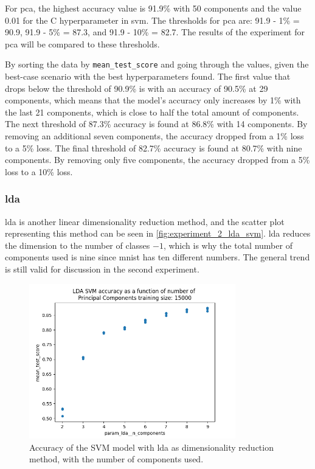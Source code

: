 For \gls{pca}, the highest accuracy value is 91.9\% with 50 components and the value 0.01 for the C hyperparameter in \gls{svm}. The thresholds for \gls{pca} are: 91.9 - 1\% = 90.9, 91.9 - 5\% = 87.3, and 91.9 - 10\% = 82.7. The results of the experiment for \gls{pca} will be compared to these thresholds.

By sorting the data by \texttt{mean\_test\_score} and going through the values, given the best-case scenario with the best hyperparameters found. The first value that drops below the threshold of 90.9\% is with an accuracy of 90.5\% at 29 components, which means that the model's accuracy only increases by 1\% with the last 21 components, which is close to half the total amount of components.
The next threshold of 87.3\% accuracy is found at 86.8\% with 14 components. By removing an additional seven components, the accuracy dropped from a 1\% loss to a 5\% loss.
The final threshold of 82.7\% accuracy is found at 80.7\% with nine components. By removing only five components, the accuracy dropped from a 5\% loss to a 10\% loss.

\subsubsection{\gls{lda}}\label{subsubsec:experiment_2_lda}
\gls{lda} is another linear dimensionality reduction method, and the scatter plot representing this method can be seen in \autoref{fig:experiment_2_lda_svm}. \gls{lda} reduces the dimension to the number of classes $-1$, which is why the total number of components used is nine since \gls{mnist} has ten different numbers. The general trend is still valid for discussion in the second experiment.


\begin{figure}[htb!]
    \centering
    \includegraphics[width=0.8\textwidth]{figures/experiment_two/lda_svm_15000.png}
    \caption{Accuracy of the SVM model with \gls{lda} as dimensionality reduction method, with the number of components used.}
    \label{fig:experiment_2_lda_svm}
\end{figure}

